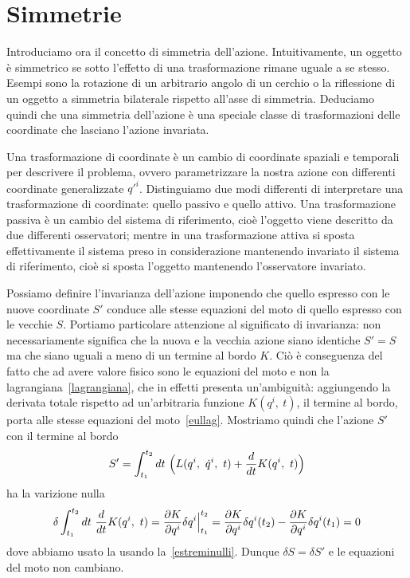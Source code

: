 \section{Simmetrie}
    
    Introduciamo ora il concetto di simmetria dell'azione. Intuitivamente, un oggetto è simmetrico se sotto l'effetto di una trasformazione rimane uguale a se stesso. Esempi sono la rotazione di un arbitrario angolo di un cerchio o la riflessione di un oggetto a simmetria bilaterale rispetto all'asse di simmetria. Deduciamo quindi che una simmetria dell'azione è una speciale classe di trasformazioni delle coordinate che lasciano l'azione invariata. 
    
    Una trasformazione di coordinate è un cambio di coordinate spaziali e temporali per descrivere il problema, ovvero parametrizzare la nostra azione con differenti coordinate generalizzate $q'^i$. Distinguiamo due modi differenti di interpretare una trasformazione di coordinate: quello passivo e quello attivo. Una trasformazione passiva è un cambio del sistema di riferimento, cioè l'oggetto viene descritto da due differenti osservatori; mentre in una trasformazione attiva si sposta effettivamente il sistema preso in considerazione mantenendo invariato il sistema di riferimento, cioè si sposta l'oggetto mantenendo l'osservatore invariato. 
    
    Possiamo definire l'invarianza dell'azione imponendo che quello espresso con le nuove coordinate $S'$ conduce alle stesse equazioni del moto di quello espresso con le vecchie $S$. Portiamo particolare attenzione al significato di invarianza: non necessariamente significa che la nuova e la vecchia azione siano identiche $S' = S$ ma che siano uguali a meno di un termine al bordo $K$. Ciò è conseguenza del fatto che ad avere valore fisico sono le equazioni del moto e non la lagrangiana~\eqref{lagrangiana}, che in effetti presenta un'ambiguità: aggiungendo la derivata totale rispetto ad un'arbitraria funzione $K(q^i, ~ t)$, il termine al bordo, porta alle stesse equazioni del moto~\eqref{eullag}. Mostriamo quindi che l'azione $S'$ con il termine al bordo
    \begin{equation*}
        S' = \int_{t_1}^{t_2}dt~ \Big ( L(q^i, ~ \dot q^i, ~t) + \frac{d}{dt} K(q^i, ~t) \Big)
    \end{equation*}
    ha la varizione nulla
    \begin{equation*}
        \delta \int_{t_1}^{t_2}dt~ \frac{d}{dt} K(q^i, ~t) = \frac{\partial K}{\partial q^i} \delta q^i \Big \vert_{t_1}^{t_2} = \frac{\partial K}{\partial q^i} \delta q^i (t_2) - \frac{\partial K}{\partial q^i} \delta q^i (t_1) = 0
    \end{equation*} 
    dove abbiamo usato la usando la~\eqref{estreminulli}. Dunque $\delta S = \delta S'$ e le equazioni del moto non cambiano.


